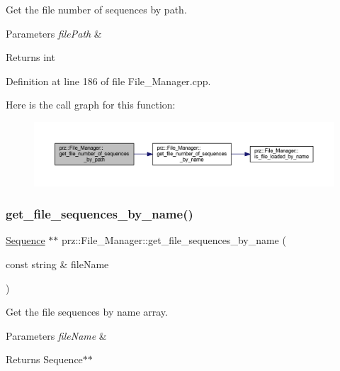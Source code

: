 Get the file number of sequences by path. 


\begin{DoxyParams}{Parameters}
{\em file\+Path} & \\
\hline
\end{DoxyParams}
\begin{DoxyReturn}{Returns}
int 
\end{DoxyReturn}


Definition at line 186 of file File\+\_\+\+Manager.\+cpp.

Here is the call graph for this function\+:
\nopagebreak
\begin{figure}[H]
\begin{center}
\leavevmode
\includegraphics[width=350pt]{classprz_1_1_file___manager_a14c8b3151837fbb69614eb30499c534a_cgraph}
\end{center}
\end{figure}
\mbox{\label{classprz_1_1_file___manager_a9e617521f5fa135f8ecb4b967eed4b7c}} 
\subsubsection{\texorpdfstring{get\_file\_sequences\_by\_name()}{get\_file\_sequences\_by\_name()}}
{\footnotesize\ttfamily \mbox{\hyperlink{classprz_1_1_sequence}{Sequence}} $\ast$$\ast$ prz\+::\+File\+\_\+\+Manager\+::get\+\_\+file\+\_\+sequences\+\_\+by\+\_\+name (\begin{DoxyParamCaption}\item[{const string \&}]{file\+Name }\end{DoxyParamCaption})}



Get the file sequences by name array. 


\begin{DoxyParams}{Parameters}
{\em file\+Name} & \\
\hline
\end{DoxyParams}
\begin{DoxyReturn}{Returns}
Sequence$\ast$$\ast$ 
\end{DoxyReturn}


